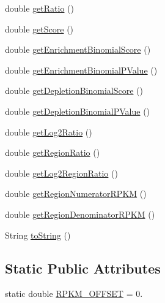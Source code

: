 \begin{DoxyCompactItemize}
double \hyperlink{classumms_1_1core_1_1model_1_1score_1_1_ratio_score_a68c52e528d1195138124c85d638eba7c}{get\+Ratio} ()
\item 
double \hyperlink{classumms_1_1core_1_1model_1_1score_1_1_ratio_score_a65ac8a6fe0603eb99cd0ba1de0302097}{get\+Score} ()
\item 
double \hyperlink{classumms_1_1core_1_1model_1_1score_1_1_ratio_score_a359817dbe99da022226d340298d05dba}{get\+Enrichment\+Binomial\+Score} ()
\item 
double \hyperlink{classumms_1_1core_1_1model_1_1score_1_1_ratio_score_a33c05dfce5f5378a5abf2b8611b7efcd}{get\+Enrichment\+Binomial\+P\+Value} ()
\item 
double \hyperlink{classumms_1_1core_1_1model_1_1score_1_1_ratio_score_a3d251d4c7a5c760668e457c6a94f03f0}{get\+Depletion\+Binomial\+Score} ()
\item 
double \hyperlink{classumms_1_1core_1_1model_1_1score_1_1_ratio_score_a493eb53da0b3502bea226ca41d6f69b7}{get\+Depletion\+Binomial\+P\+Value} ()
\item 
double \hyperlink{classumms_1_1core_1_1model_1_1score_1_1_ratio_score_a8dc892f53be6a5499835d5e61ac919a7}{get\+Log2\+Ratio} ()
\item 
double \hyperlink{classumms_1_1core_1_1model_1_1score_1_1_ratio_score_ac9e25c283add9bccf9953ed67f6ad6de}{get\+Region\+Ratio} ()
\item 
double \hyperlink{classumms_1_1core_1_1model_1_1score_1_1_ratio_score_a5c2c20f663cc34c2b54aa7358e8adf05}{get\+Log2\+Region\+Ratio} ()
\item 
double \hyperlink{classumms_1_1core_1_1model_1_1score_1_1_ratio_score_a1cd82d1ae365cb76b06c021a571e65cf}{get\+Region\+Numerator\+R\+P\+K\+M} ()
\item 
double \hyperlink{classumms_1_1core_1_1model_1_1score_1_1_ratio_score_ad98b3c84e8de43604cf72faad4218649}{get\+Region\+Denominator\+R\+P\+K\+M} ()
\item 
String \hyperlink{classumms_1_1core_1_1model_1_1score_1_1_ratio_score_a9edd203098275f6033a924790560832d}{to\+String} ()
\end{DoxyCompactItemize}
\subsection*{Static Public Attributes}
\begin{DoxyCompactItemize}
\item 
static double \hyperlink{classumms_1_1core_1_1model_1_1score_1_1_ratio_score_a03728176e61842d5a08f7aad5d594f28}{R\+P\+K\+M\+\_\+\+O\+F\+F\+S\+E\+T} = 0.
\end{DoxyCompactItemize}
